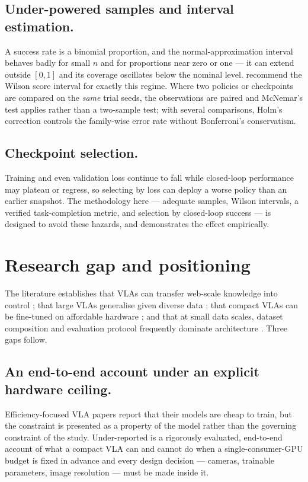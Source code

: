 \subsection{Under-powered samples and interval estimation.} A success rate is a binomial
proportion, and the normal-approximation interval behaves badly for small $n$ and for
proportions near zero or one --- it can extend outside $[0,1]$ and its coverage
oscillates below the nominal level. \textcite{brown2001binomial} recommend the Wilson
score interval \parencite{wilson1927ci} for exactly this regime. Where two policies or
checkpoints are compared on the \emph{same} trial seeds, the observations are paired and
McNemar's test \parencite{mcnemar1947test} applies rather than a two-sample test; with
several comparisons, Holm's correction \parencite{holm1979correction} controls the
family-wise error rate without Bonferroni's conservatism.

\subsection{Checkpoint selection.} Training and even validation loss continue to fall
while closed-loop performance may plateau or regress, so selecting by loss can deploy a
worse policy than an earlier snapshot. The methodology here --- adequate samples, Wilson
intervals, a verified task-completion metric, and selection by closed-loop success ---
is designed to avoid these hazards, and  demonstrates the
effect empirically.

\section{Research gap and positioning}
\label{sec:bg-gap}
The literature establishes that VLAs can transfer web-scale knowledge into control
\parencite{zitkovich2023rt2, brohan2023rt1}; that large VLAs generalise given diverse
data \parencite{black2025pi05, padalkar2024openx}; that compact VLAs can be fine-tuned
on affordable hardware \parencite{shukor2025smolvla, kiviranta2025smolvla,
wen2025tinyvla}; and that at small data scales, dataset composition and evaluation
protocol frequently dominate architecture \parencite{mandlekar2021robomimic,
lin2025datascaling}. Three gaps follow.

\subsection{An end-to-end account under an explicit hardware ceiling.}
Efficiency-focused VLA papers report that their models are cheap to train, but the
constraint is presented as a property of the model rather than the governing constraint
of the study. Under-reported is a rigorously evaluated, end-to-end account of what a
compact VLA can and cannot do when a single-consumer-GPU budget is fixed in advance and
every design decision --- cameras, trainable parameters, image resolution --- must be
made inside it.

